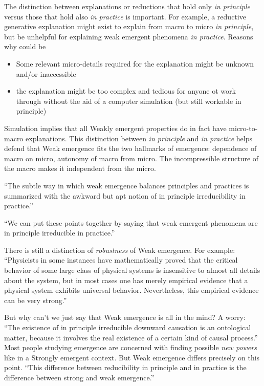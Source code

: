 \documentclass{article}
\newcommand{\ti}[1]{\textit{#1}}
\begin{document}
The distinction between explanations or reductions that hold only \ti{in principle} versus those that hold also \ti{in practice} is important. For example, a reductive generative explanation might exist to explain from macro to micro \ti{in principle}, but be unhelpful for explaining weak emergent phenomena \ti{in practice}. Reasons why could be
\begin{itemize}
    \item Some relevant micro-details required for the explanation might be unknown and/or inaccessible
    \item the explanation might be too complex and tedious for anyone ot work through without the aid of a computer simulation (but still workable in principle)
\end{itemize}

Simulation implies that all Weakly emergent properties do in fact have micro-to-macro explanations. This distinction between \ti{in principle} and \ti{in practice} helps defend that Weak emergence fits the two hallmarks of emergence: dependence of macro on micro, autonomy of macro from micro. The incompressible structure of the macro makes it independent from the micro.

``The subtle way in which weak emergence balances principles and practices is summarized with the awkward but apt notion of in principle irreducibility in practice.''

``We can put these points together by saying that weak emergent phenomena are in principle irreducible in practice.''

There is still a distinction of \ti{robustness} of Weak emergence. For example: ``Physicists in some instances have mathematically proved that the critical behavior of some large class of physical systems is insensitive to almost all details about the system, but in most cases one has merely empirical evidence that a physical system exhibits universal behavior. Nevertheless, this empirical evidence can be very strong.''

But why can't we just say that Weak emergence is all in the mind? A worry: ``The existence of in principle irreducible downward causation is an ontological matter, because it involves the real existence of a certain kind of causal process.'' Most people studying emergence are concerned with finding possible \ti{new powers} like in a Strongly emergent context. But Weak emergence differs precisely on this point. ``This difference between reducibility in principle and in practice is the difference between strong and weak emergence.''
\end{document}
